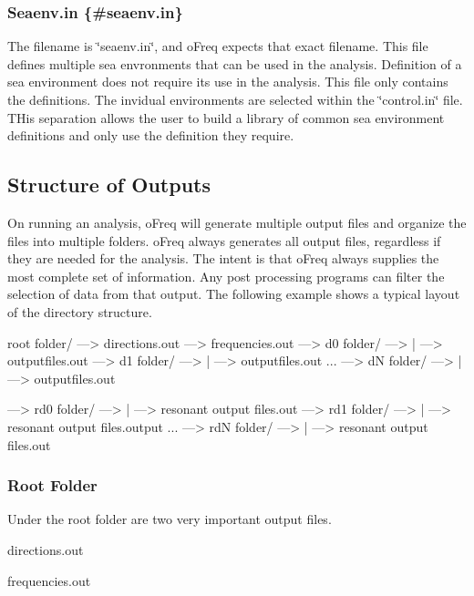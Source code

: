 \subsubsection*{Seaenv.\-in \{\#seaenv.\-in\}}

The filename is \char`\"{}seaenv.\-in\char`\"{}, and o\-Freq expects that exact filename. This file defines multiple sea envronments that can be used in the analysis. Definition of a sea environment does not require its use in the analysis. This file only contains the definitions. The invidual environments are selected within the \char`\"{}control.\-in\char`\"{} file. T\-His separation allows the user to build a library of common sea environment definitions and only use the definition they require.\hypertarget{directory_structure_outputs_structure1}{}\subsection{Structure of Outputs}\label{directory_structure_outputs_structure1}
On running an analysis, o\-Freq will generate multiple output files and organize the files into multiple folders. o\-Freq always generates all output files, regardless if they are needed for the analysis. The intent is that o\-Freq always supplies the most complete set of information. Any post processing programs can filter the selection of data from that output. The following example shows a typical layout of the directory structure. \begin{DoxyVerb}root folder/
--->  directions.out
--->  frequencies.out
--->  d0 folder/
---> | --->  outputfiles.out
--->  d1 folder/
---> | --->  outputfiles.out
...
--->  dN folder/
---> | --->  outputfiles.out

--->  rd0 folder/
---> | ---> resonant output files.out
--->  rd1 folder/
---> | ---> resonant output files.output
...
--->  rdN folder/
---> | ---> resonant output files.out
\end{DoxyVerb}
\hypertarget{directory_structure_root}{}\subsubsection{Root Folder}\label{directory_structure_root}
Under the root folder are two very important output files.


\begin{DoxyEnumerate}
\item directions.\-out
\item frequencies.\-out
\end{DoxyEnumerate}

